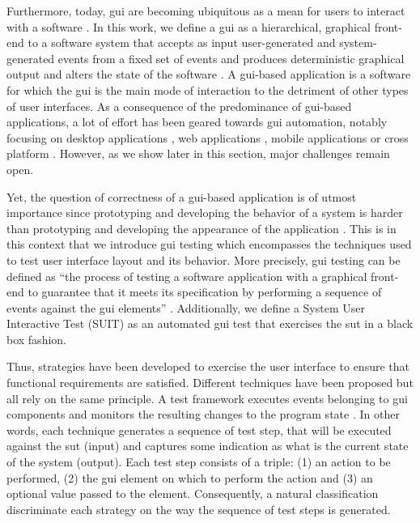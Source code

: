 Furthermore, today, \gls{gui} are becoming ubiquitous as a mean for users to interact with a software \cite{Myers1992, Myers1995, Brooks2009, Memon2010}. In this work, we define a \gls{gui} as a hierarchical, graphical front-end to a software system that accepts as input user-generated and system-generated events from a fixed set of events and produces deterministic graphical output \cite{Memon2007} and alters the state of the software \cite{Nguyen2014}. A \gls{gui}-based application is a software for which the \gls{gui} is the main mode of interaction to the detriment of other types of user interfaces. As a consequence of the predominance of \gls{gui}-based applications, a lot of effort has been geared towards \gls{gui} automation, notably focusing on desktop applications \cite{Nguyen2014, Advolodkin2018, Pezze2018}, web applications \cite{Mesbah2009, Biagiola2019}, mobile applications \cite{Machiry2013, Gomez2013, Mao2016, Salihu2019, Yu2019} or cross platform \cite{Canny2020}. However, as we show later in this section, major challenges remain open.

Yet, the question of correctness of a \gls{gui}-based application is of utmost importance since prototyping and developing the behavior of a system is harder than prototyping and developing the appearance of the application \cite{Myers2008}. This is in this context that we introduce \gls{gui} testing which encompasses the techniques used to test user interface layout and its behavior. More precisely, \gls{gui} testing can be defined as ``the process of testing a software application with a graphical front-end to guarantee that it meets its specification by performing a sequence of events against the \gls{gui} elements'' \cite{Cunha2010, Banerjee2013, Issa2012}. Additionally, we define a System User Interactive Test (SUIT) as an automated \gls{gui} test that exercises the \gls{sut} in a black box fashion.

Thus, strategies have been developed to exercise the user interface to ensure that functional requirements are satisfied. Different techniques have been proposed but all rely on the same principle. A test framework executes events belonging to \gls{gui} components and monitors the resulting changes to the program state \cite{Nguyen2014}. In other words, each technique generates a sequence of test step, that will be executed against the \gls{sut} (input) and captures some indication as what is the current state of the system (output). Each test step consists of a triple: (1) an action to be performed, (2) the \gls{gui} element on which to perform the action and (3) an optional value passed to the element. Consequently, a natural classification discriminate each strategy on the way the sequence of test steps is generated.

